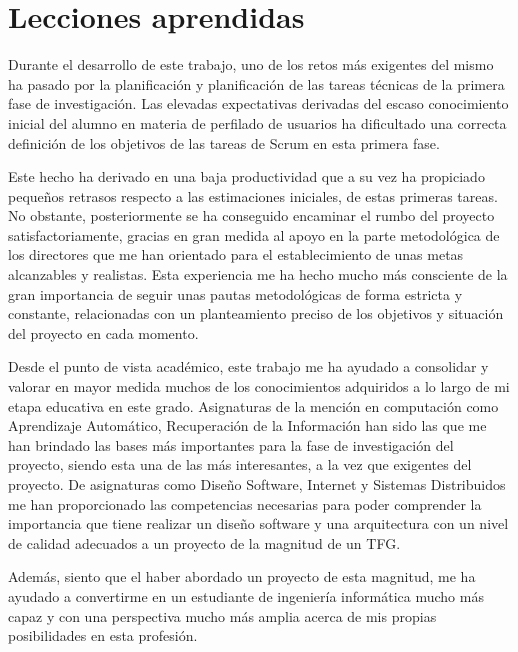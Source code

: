 \section{Lecciones aprendidas}
Durante el desarrollo de este trabajo, uno de los retos más exigentes del mismo ha pasado por la planificación y planificación de las tareas técnicas de la primera fase de investigación. Las elevadas expectativas derivadas del escaso conocimiento inicial del alumno en materia de perfilado de usuarios ha dificultado una correcta definición de los objetivos de las tareas de Scrum en esta primera fase. 

Este hecho ha derivado en una baja productividad que a su vez ha propiciado pequeños retrasos respecto a las estimaciones iniciales, de estas primeras tareas. No obstante, posteriormente se ha conseguido encaminar el rumbo del proyecto satisfactoriamente, gracias en gran medida al apoyo en la parte metodológica de los directores que me han orientado para el establecimiento de unas metas alcanzables y realistas. Esta experiencia me ha hecho mucho más consciente de la gran importancia de seguir unas pautas metodológicas de forma estricta y constante, relacionadas con un planteamiento preciso de los objetivos y situación del proyecto en cada momento.

Desde el punto de vista académico, este trabajo me ha ayudado a consolidar y valorar en mayor medida muchos de los conocimientos adquiridos a lo largo de mi etapa educativa en este grado. Asignaturas de la mención en computación como Aprendizaje Automático, Recuperación de la Información han sido las que me han brindado las bases más importantes para la fase de investigación del proyecto, siendo esta una de las más interesantes, a la vez que exigentes del proyecto. De asignaturas como Diseño Software, Internet y Sistemas Distribuidos me han proporcionado las competencias necesarias para poder comprender la importancia que tiene realizar un diseño software y una arquitectura con un nivel de calidad adecuados a un proyecto de la magnitud de un TFG.

Además, siento que el haber abordado un proyecto de esta magnitud, me ha ayudado a convertirme en un estudiante de ingeniería informática mucho más capaz y con una perspectiva mucho más amplia acerca de mis propias posibilidades en esta profesión.


